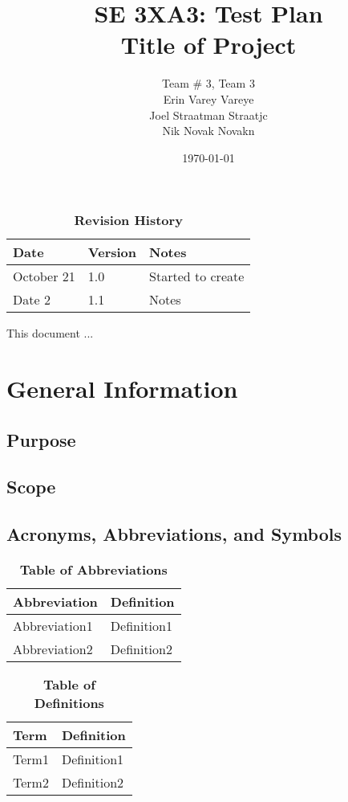 \documentclass[12pt, titlepage]{article}
\title{SE 3XA3: Test Plan\\Title of Project}
\author{Team \# 3, Team 3
		\\ Erin Varey Vareye
		\\ Joel Straatman Straatjc
		\\ Nik Novak 	Novakn
}
\date{\today}
\begin{document}
\maketitle
{}
\tableofcontents
\listoftables
\listoffigures
\begin{table}[bp]
\caption{\bf Revision History}
\begin{tabularx}{\textwidth}{p{3cm}p{2cm}X}
\toprule {\bf Date} & {\bf Version} & {\bf Notes}\\
\midrule
October 21 & 1.0 & Started to create\\
Date 2 & 1.1 & Notes\\
\bottomrule
\end{tabularx}
\end{table}
\newpage
{}
This document ...
\section{General Information}
\subsection{Purpose}
\subsection{Scope}
\subsection{Acronyms, Abbreviations, and Symbols}
	
\begin{table}[hbp]
\caption{\textbf{Table of Abbreviations}} \label{Table}
\begin{tabularx}{\textwidth}{p{3cm}X}
\toprule
\textbf{Abbreviation} & \textbf{Definition} \\
\midrule
Abbreviation1 & Definition1\\
Abbreviation2 & Definition2\\
\bottomrule
\end{tabularx}
\end{table}
\begin{table}[!htbp]
\caption{\textbf{Table of Definitions}} \label{Table}
\begin{tabularx}{\textwidth}{p{3cm}X}
\toprule
\textbf{Term} & \textbf{Definition}\\
\midrule
Term1 & Definition1\\
Term2 & Definition2\\
\bottomrule
\end{tabularx}
\end{table}	
\end{document}

